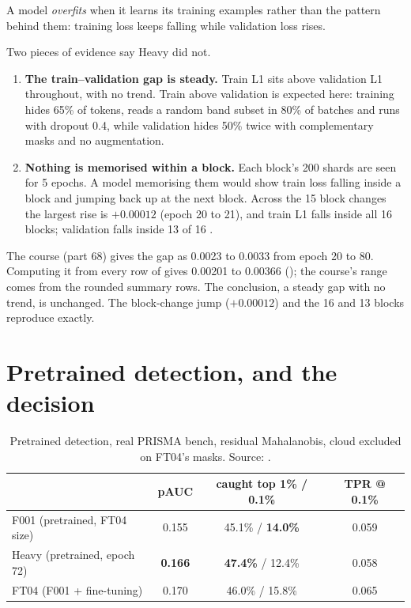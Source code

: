 \begin{definition}[Overfitting]
A model \emph{overfits} when it learns its training examples rather than the pattern behind
them: training loss keeps falling while validation loss rises.
\end{definition}

Two pieces of evidence say Heavy did not.
\begin{enumerate}
\item \textbf{The train--validation gap is steady.} Train L1 sits above validation L1 throughout, with no trend.
  Train above validation is expected here: training hides 65\% of tokens, reads a random band subset in 80\% of
  batches and runs with dropout 0.4, while validation hides 50\% twice with complementary masks and no
  augmentation.
\item \textbf{Nothing is memorised within a block.} Each block's 200 shards are seen for 5 epochs. A model
  memorising them would show train loss falling inside a block and jumping back up at the next block. Across the
  15 block changes the largest rise is $+0.00012$ (epoch 20 to 21), and train L1 falls inside all 16 blocks;
  validation falls inside 13 of 16 \tagC.
\end{enumerate}

\begin{sourcenote}
The course (part 68) gives the gap as 0.0023 to 0.0033 from epoch 20 to 80. Computing it from every row of
 gives 0.00201 to 0.00366 \tagC ();
the course's range comes from the rounded summary rows. The conclusion, a steady gap with no trend, is unchanged.
The block-change jump ($+0.00012$) and the 16 and 13 blocks reproduce exactly.
\end{sourcenote}

\section{Pretrained detection, and the decision}\label{sec:heavy:pretraineddet}

\begin{table}[htbp]
\centering
\begin{tabular}{lccc}
\toprule
 & pAUC & caught top 1\% / 0.1\% & TPR @ 0.1\%\\
\midrule
F001 (pretrained, FT04 size) & 0.155 & 45.1\% / \textbf{14.0\%} & 0.059\\
Heavy (pretrained, epoch 72) & \textbf{0.166} & \textbf{47.4\%} / 12.4\% & 0.058\\
FT04 (F001 + fine-tuning) & 0.170 & 46.0\% / 15.8\% & 0.065\\
\bottomrule
\end{tabular}
\caption{Pretrained detection, real PRISMA bench, residual Mahalanobis, cloud excluded on FT04's masks. Source:
.}
\label{tab:heavy:pretrained}
\end{table}

